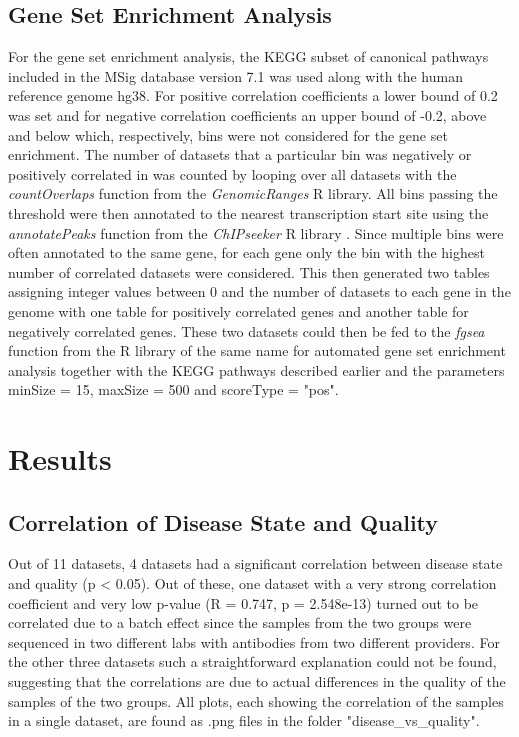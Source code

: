 \documentclass[5p]{elsarticle}
\begin{document}
\subsection{Gene Set Enrichment Analysis}
For the gene set enrichment analysis, the KEGG subset of canonical pathways included in the MSig database version 7.1 was used along with the human reference genome hg38. For positive correlation coefficients a lower bound of 0.2 was set and for negative correlation coefficients an upper bound of -0.2, above and below which, respectively, bins were not considered for the gene set enrichment. The number of datasets that a particular bin was negatively or positively correlated in was counted by looping over all datasets with the \textit{countOverlaps} function from the \textit{GenomicRanges} R library. All bins passing the threshold were then annotated to the nearest transcription start site using the \textit{annotatePeaks} function from the \textit{ChIPseeker} R library \cite{yu_chipseeker_2015}. Since multiple bins were often annotated to the same gene, for each gene only the bin with the highest number of correlated datasets were considered. This then generated two tables assigning integer values between 0 and the number of datasets to each gene in the genome with one table for positively correlated genes and another table for negatively correlated genes. These two datasets could then be fed to the \textit{fgsea} function from the R library of the same name for automated gene set enrichment analysis \cite{korotkevich_fast_2019} together with the KEGG pathways described earlier and the parameters minSize = 15, maxSize = 500 and scoreType = "pos". 

\section{Results}

\subsection{Correlation of Disease State and Quality}
Out of 11 datasets, 4 datasets had a significant correlation between disease state and quality (p < 0.05). Out of these, one dataset with a very strong correlation coefficient and very low p-value (R = 0.747, p = 2.548e-13) turned out to be correlated due to a batch effect since the samples from the two groups were sequenced in two different labs with antibodies from two different providers. For the other three datasets such a straightforward explanation could not be found, suggesting that the correlations are due to actual differences in the quality of the samples of the two groups. All plots, each showing the correlation of the samples in a single dataset, are found as .png files in the folder "disease\_vs\_quality".
\end{document}

